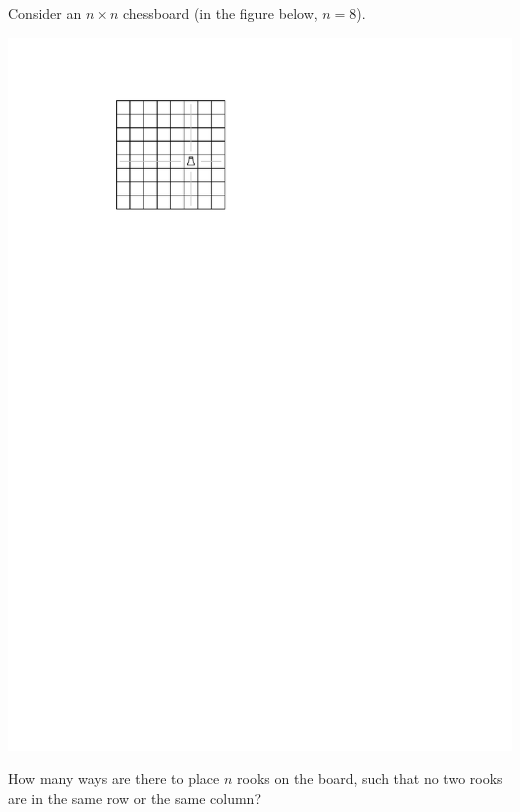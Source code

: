 \documentclass[12pt]{article}
\begin{document}
\begin{problem}{12}
    Consider an $n \times n$ chessboard (in the figure below, $n=8$).

    \begin{center}
        \includegraphics[page=1]{board}
    \end{center}

    \bparts
        How many ways are there to place $n$ rooks on the board, such that no two rooks are in the same row or the same column? 


\end{problem}
\end{document}
